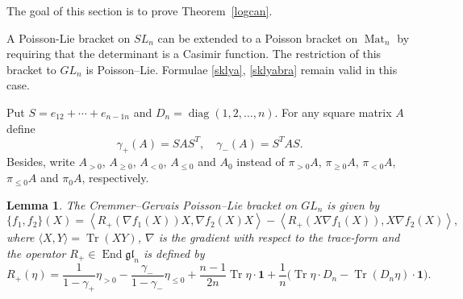\documentclass{amsart}
\newtheorem{lemma}[theorem]{Lemma}
\theoremstyle{definition}
\theoremstyle{remark}
\numberwithin{equation}{section}
\numberwithin{theorem}{section}
\begin{document}
The goal of this section is to prove Theorem~\ref{logcan}.

A Poisson-Lie bracket on $SL_n$ can be extended to a Poisson bracket on ${\operatorname{Mat}}_n$ by requiring that
the determinant is a Casimir function. The restriction of this bracket to $GL_n$ is Poisson--Lie.
Formulae \eqref{sklya}, \eqref{sklyabra}
remain valid in this case.

Put $S = e_{12} + \cdots + e_{n-1 n}$ and $D_n={\operatorname{diag}} (1,2,\ldots,n)$.  For any square matrix $A$ define
$$
\gamma_+ (A) = S A S^T, \quad \gamma_- (A) = S^T A  S.
$$
Besides, write $A_{>0}$, $A_{\geq 0}$, $A_{<0}$, $A_{\leq 0}$ and $A_0$
instead of $\pi_{>0}A$,  $\pi_{\geq 0}A$, $\pi_{<0}A$, $\pi_{\leq 0}A$ and $\pi_0A$, respectively.

\begin{lemma}
\label{CGR}
The Cremmer--Gervais Poisson--Lie bracket on $GL_n$ is given by 
\[
\{ f_1, f_2\}(X) = \left \langle  R_+ (\nabla f_1(X)) X,  \nabla f_2(X) X\right \rangle -  
\left \langle  R_+ (  X \nabla f_1(X) ), X \nabla f_2(X)  \right \rangle,
\]
where
$\langle X, Y\rangle = {\operatorname{Tr}}(XY)$, 
$\nabla$ is the gradient with respect to the trace-form and the operator $R_+\in {\operatorname{End}} {\mathfrak g\mathfrak l}_n$ 
is defined by
\begin{equation}
R_+(\eta) =  \frac{1}{1-\gamma_+} \eta_{> 0} - \frac{\gamma_-}{1-\gamma_-} \eta_{\leq 0} 
+\frac {n-1} {2n}{\operatorname{Tr}} \eta \cdot{\mathbf 1}   + \frac{1}{n} \big ({\operatorname{Tr}} \eta \cdot D_n - {\operatorname{Tr}} (D_n \eta)\cdot{\mathbf 1}\big ).
\label{R+CG} 
\end{equation}
\end{lemma}
\end{document}
